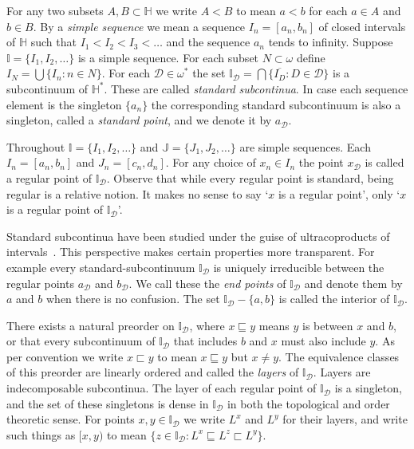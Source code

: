 \documentclass[12pt]{article}
\theoremstyle{plain}
\theoremstyle{definition}
\newcommand{\W}{\ensuremath{\omega}}
\newcommand{\II}{\ensuremath{\mathbb I}}
\newcommand{\JJ}{\ensuremath{\mathbb J}}
\newcommand{\HH}{\ensuremath{\mathbb H}}
\newcommand{\0}{\ensuremath{\varnothing}}
\newcommand{\cD}{\ensuremath{\mathcal D}}
\begin{document}
	For any two subsets $A,B \subset \HH$ we write $A < B$ to mean $a<b$ for each $a \in A$ and $b \in B$. 
	By a \textit{simple sequence} we mean a sequence $I_n = [a_n,b_n]$ of closed intervals  of $\HH$ 
	such that $I_1 < I_2 < I_3 < \ldots$ and the sequence $a_n$ tends to infinity. 
	Suppose $\II = \{I_1,I_2, \ldots \}$ is a simple sequence. 
	For each subset $N \subset \W$ define $I_N = \bigcup \{I_n \colon n \in N\}$. 
	For each $\cD \in \W^*$ the set $\II_\cD = \bigcap \big \{ \overline {I_D} \colon D \in \cD \big \}$ is a subcontinuum of $\HH^*$. 
	These are called \textit{standard subcontinua}.  
	In case each sequence element is the singleton $\{a_n\}$ the corresponding standard subcontinuum is also a singleton, 
	called a \textit{standard point}, and we denote it by $a_\cD$.
	
	
	Throughout $\II = \{I_1,I_2, \ldots \}$ and $\JJ = \{J_1,J_2, \ldots \}$ are simple sequences. Each $I_n = [a_n,b_n]$ and $J_n = [c_n,d_n]$. For any choice of $x_n \in I_n$ the point $x_\cD$ is called a regular point of $\II_\cD$. Observe that while every regular point is standard, being regular is a relative notion. It makes no sense to say `$x$ is a regular point', only  `$x$ is a regular point of $\II_\cD$'.
	
	Standard subcontinua have been studied under the guise of ultracoproducts of intervals~\cite{PaulSSC}. This perspective makes certain properties more transparent. For example every standard-subcontinuum $\II_\cD$ is uniquely irreducible between the regular points $a_\cD$ and $b_\cD$. We call these the \textit{end points} of $\II_\cD$ and denote them by $a$ and $b$ when there is no confusion. The set $\II_\cD - \{a,b\}$ is called the interior of $\II_\cD$.
	
	There exists a natural preorder on $\II_\cD$, where  $x \sqsubseteq y$ means $y$ is between $x$ and $b$, or that every subcontinuum of $\II_\cD$ that 
	includes $b$ and $x$ must also include $y$. As per convention we write $x \sqsubset y$ to mean $x \sqsubseteq y$ but $x \ne y$. The equivalence classes of this preorder are linearly ordered and called the \textit{layers} of $\II_\cD$. 
	Layers are indecomposable subcontinua. The layer of each regular point of $\II_\cD$ is a singleton, and the set of these singletons is dense in $\II_\cD$ 
	in both the topological and order theoretic sense. For points $x,y \in \II_\cD$ we write $L^x$ and $L^y$ for their layers, and write such things as $[x,y)$ 
	to mean $ \{z \in \II_\cD \colon L^x \sqsubseteq L^z \sqsubset L^y\}$. 
	
\end{document}
